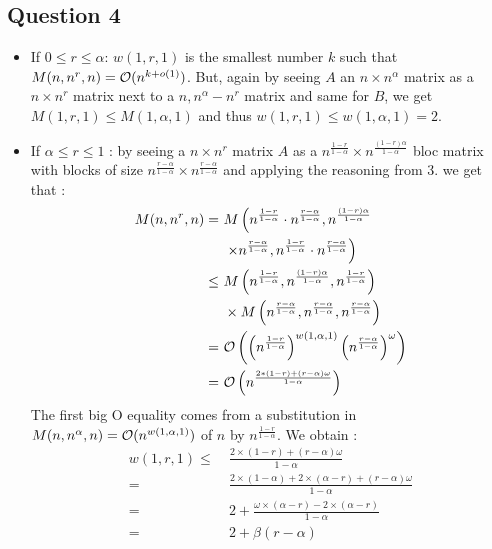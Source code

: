 \documentclass{cours}
\begin{document}
        \subsection{Question 4}
            \begin{itemize}
                \item If $0 \leq r \leq \alpha$: $w(1, r, 1)$ is the smallest number $k$ such that $M(n, n^{r}, n) = \mathcal{O}(n^{k + o(1)})$. But, again by seeing $A$ an $n\times n^{\alpha}$ matrix as a $n\times n^{r}$ matrix next to a $n, n^{\alpha} - n^{r}$ matrix and same for $B$, we get $M(1, r, 1) \leq M(1, \alpha, 1)$ and thus $w(1, r, 1) \leq w(1, \alpha, 1) = 2$.
                \item If $\alpha \leq r \leq 1$ : by seeing a $n \times n^{r}$ matrix $A$ as a $n^{\frac{1 - r}{1 - \alpha}} \times n^{\frac{\left(1 - r\right)\alpha}{1 - \alpha}}$ bloc matrix with blocks of size $n^{\frac{r - \alpha}{1 - \alpha }}\times n^{\frac{r - \alpha}{1 - \alpha}}$ and applying the reasoning from 3. we get that :
                \[
                    \begin{aligned}
                        M(n, n^{r}, n) = &\ M\left(n^{\frac{1 - r}{1 - \alpha}} \cdot n^{\frac{r - \alpha}{1 - \alpha }}, n^{\frac{\left(1 - r\right)\alpha}{1 - \alpha}}\right.\\
                        &\ \left.\times n^{\frac{r - \alpha}{1 - \alpha}}, n^{\frac{1 - r}{1 - \alpha}} \cdot n^{\frac{r - \alpha}{1 - \alpha }}\right)\\
                         \leq&\  M\left(n^{\frac{1 - r}{1 - \alpha}}, n^{\frac{(1 - r)\alpha}{1 - \alpha}}, n^{\frac{1 - r}{1 - \alpha}}\right)\\
                        &\ \times M\left(n^{\frac{r - \alpha}{1 - \alpha}}, n^{\frac{r - \alpha}{1 - \alpha}}, n^{\frac{r - \alpha}{1 - \alpha}}\right)\\
                        = &\ \mathcal{O}\left(\left(n^{\frac{1 - r}{1 - \alpha}}\right)^{{w(1, \alpha, 1)}}\left(n^{\frac{r - \alpha}{1 - \alpha}}\right)^{\omega}\right)\\
                        = &\ \mathcal{O}\left(n^{\frac{2 * (1 - r) + \left(r - \alpha\right) \omega}{1 - \alpha}}\right)
                    \end{aligned}
                \]
                The first big O equality comes from a substitution in $M(n, n^{\alpha}, n) = \mathcal{O}(n^{w(1, \alpha, 1)})$ of $n$ by $n^{\frac{1 - r}{1 - \alpha}}$.
                We obtain :
                \[
                    \begin{aligned}
                        w(1, r, 1)  \leq &\ \frac{2 \times \left(1 - r\right) + \left(r - \alpha\right)\omega}{1 - \alpha}\\
                        = &\ \frac{2 \times \left(1 - \alpha\right) + 2 \times \left(\alpha - r\right) + \left(r - \alpha\right) \omega}{1 - \alpha}\\
                        = &\ 2 + \frac{\omega \times \left(\alpha - r\right) - 2 \times \left(\alpha - r\right)}{1 - \alpha}\\
                        = &\ 2 + \beta(r - \alpha)
                    \end{aligned}
                \]
            \end{itemize}
\end{document}
